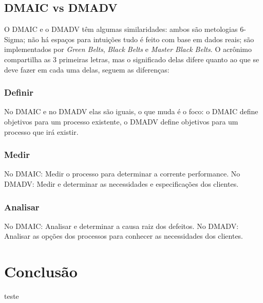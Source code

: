 \documentclass{abnt}
\begin{document}
			\section {DMAIC vs DMADV}
				O DMAIC e o DMADV têm algumas similaridades: ambos são metologias 6-Sigma; não há espaços para intuições 
				tudo é feito com base em dados reais; são implementados por \textit{Green Belts}, \textit{Black Belts} e \textit{Master Black Belts}.
				O acrônimo compartilha as 3 primeiras letras, mas o significado delas difere quanto ao que se deve fazer em cada uma delas, 
				seguem as diferenças:
				\subsection {Definir}
				No DMAIC e no DMADV elas são iguais, o que muda é o foco: o DMAIC define objetivos para um processo existente, 
				o DMADV define objetivos para um processo que irá existir.
				\subsection {Medir}
				No DMAIC: Medir o processo para determinar a corrente performance.
				No DMADV: Medir e determinar as necessidades e especificações dos clientes.
				\subsection {Analisar}
				No DMAIC: Analisar e determinar a causa raiz dos defeitos. 
				No DMADV: Analisar as opções dos processos para conhecer as necessidades dos clientes.
	
	\chapter {Conclusão}
	
	\begin{thebibliography}{99}
		 teste
	\end{thebibliography}
\end{document}
